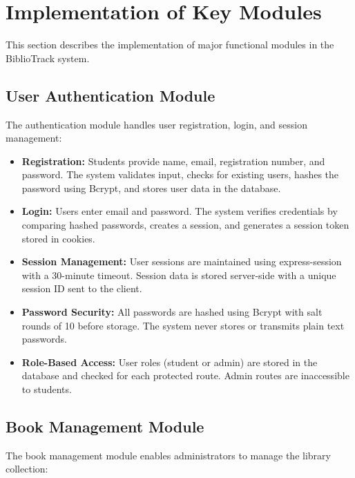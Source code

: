 \documentclass[12pt,a4paper]{report}
\begin{document}
\section{Implementation of Key Modules}
\label{sec:keymodules}

This section describes the implementation of major functional modules in the BiblioTrack system.

\subsection{User Authentication Module}

The authentication module handles user registration, login, and session management:

\begin{itemize}
    \item \textbf{Registration:} Students provide name, email, registration number, and password. The system validates input, checks for existing users, hashes the password using Bcrypt, and stores user data in the database.
    
    \item \textbf{Login:} Users enter email and password. The system verifies credentials by comparing hashed passwords, creates a session, and generates a session token stored in cookies.
    
    \item \textbf{Session Management:} User sessions are maintained using express-session with a 30-minute timeout. Session data is stored server-side with a unique session ID sent to the client.
    
    \item \textbf{Password Security:} All passwords are hashed using Bcrypt with salt rounds of 10 before storage. The system never stores or transmits plain text passwords.
    
    \item \textbf{Role-Based Access:} User roles (student or admin) are stored in the database and checked for each protected route. Admin routes are inaccessible to students.
\end{itemize}

\subsection{Book Management Module}

The book management module enables administrators to manage the library collection:
\end{document}
